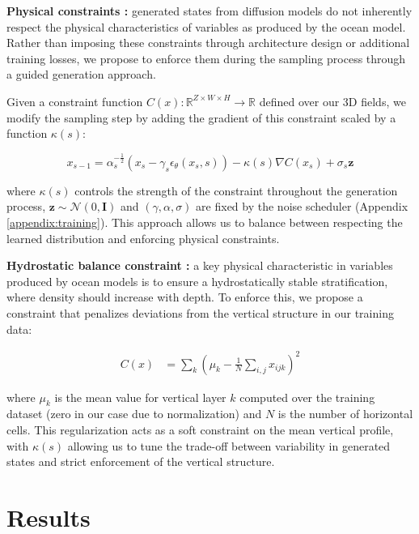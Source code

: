 \documentclass{article}
\begin{document}
\textbf{Physical constraints :}
generated states from diffusion models do not inherently respect the physical %
characteristics of variables as produced by the ocean model.
Rather than imposing these constraints through architecture design or additional training losses, we propose to enforce them during the sampling process through a guided generation approach.

Given a constraint function $C(x) : \mathbb{R}^{Z \times W \times H} \to \mathbb{R}$ defined over our 3D fields, we modify the sampling step by adding the gradient of this constraint scaled by a function $\kappa(s)$:

\begin{equation}
    x_{s-1} = \alpha_s^{-\frac12}(x_s - \gamma_s\epsilon_\theta(x_s, s) )- \kappa(s) \nabla C(x_s) + \sigma_s \mathbf{z}
\end{equation}

where $\kappa(s)$ controls the strength of the constraint throughout the generation process, $\mathbf{z} \sim \mathcal{N}(0, \mathbf{I})$ and $(\gamma, \alpha, \sigma)$ are fixed by the noise scheduler (Appendix \ref{appendix:training}). This approach allows us to balance between respecting the learned distribution and enforcing physical constraints.


\textbf{Hydrostatic balance constraint :} a %
key
physical %
characteristic in variables produced by ocean models
is to ensure a hydrostatically stable stratification, where density should increase with depth. To enforce this, we propose a constraint that penalizes deviations from the vertical structure in our training data:

\vspace{-0.3cm}
\begin{align}
    C(x) &= %
    \sum_{k} ( \mu_k - \frac{1}{N}\sum_{i,j} x_{ijk})^2 %
\end{align}

where $\mu_k$ is the mean value for vertical layer $k$ computed over the training dataset (zero in our case due to normalization) and $N$ is the number of horizontal cells. This regularization acts as a soft constraint on the mean vertical profile, with $\kappa(s)$ allowing us to tune the trade-off between variability in generated states and strict enforcement of the vertical structure.

\section{Results}
\end{document}

